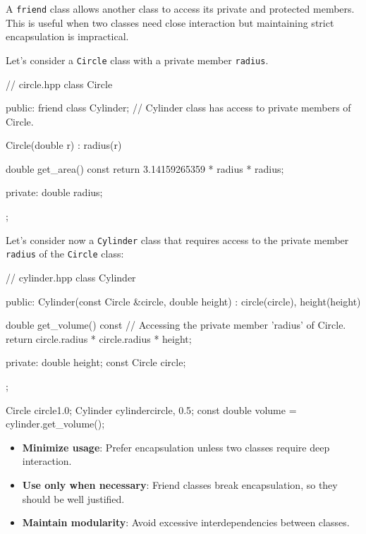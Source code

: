 A \texttt{friend} class allows another class to access its private and protected members. This is useful when two classes need close interaction but maintaining strict encapsulation is impractical.

\vspace{0.5em}

Let's consider a \texttt{Circle} class with a private member \texttt{radius}.

\begin{codeblock}[language=C++, numbers=none]
// circle.hpp
class Circle {
public:
    friend class Cylinder;
    // Cylinder class has access to private members of Circle.

    Circle(double r) : radius(r) {}

    double get_area() const {
        return 3.14159265359 * radius * radius;
    }

private:
    double radius;
};
\end{codeblock}

Let's consider now a \texttt{Cylinder} class that requires access to the private member \texttt{radius} of the \texttt{Circle} class:

\begin{codeblock}[language=C++, numbers=none]
// cylinder.hpp
class Cylinder {
public:
    Cylinder(const Circle &circle, double height)
        : circle(circle), height(height) {}
    
    double get_volume() const {
        // Accessing the private member 'radius' of Circle.
        return circle.radius * circle.radius * height;
    }

private:
    double height;
    const Circle circle;
};

Circle circle{1.0};
Cylinder cylinder{circle, 0.5};
const double volume = cylinder.get_volume();
\end{codeblock}

\begin{tipsblock}
    \begin{itemize}
        \item \textbf{Minimize usage}: Prefer encapsulation unless two classes require deep interaction.
        \item \textbf{Use only when necessary}: Friend classes break encapsulation, so they should be well justified.
        \item \textbf{Maintain modularity}: Avoid excessive interdependencies between classes.
    \end{itemize}
\end{tipsblock}

